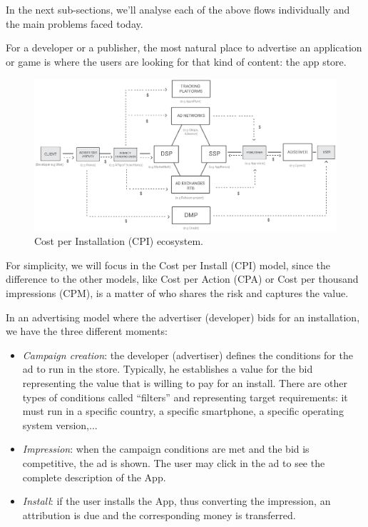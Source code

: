 

In the next sub-sections, we'll analyse each of the above flows individually and the main problems faced today.


For a developer or a publisher, the most natural place to advertise an application or game is where the users are looking for that kind of content: the app store.

\begin{figure}[!ht]
\centering
\includegraphics[width=\textwidth]{diagrams/cpi_flow.eps}
\caption{Cost per Installation (CPI) ecosystem.}
\label{fig:exist_flows}
\end{figure}

For simplicity, we will focus in the Cost per Install (CPI) model, since the difference to the other models, like Cost per Action (CPA) or Cost per thousand impressions (CPM), is a matter of who shares the risk and captures the value.

In an advertising model where the advertiser (developer) bids for an installation, we have the three different moments:


\begin{itemize}
\item {\em Campaign creation}: the developer (advertiser) defines the conditions for the ad to run in the store. Typically, he establishes a value for the bid representing the value that is willing to pay for an install. There are other types of conditions called ``filters'' and representing target requirements: it must run in a specific country, a specific smartphone, a specific operating system version,...
\item {\em Impression}: when the campaign conditions are met and the bid is competitive, the ad is shown. The user may click in the ad to see the complete description of the App.
\item {\em Install}: if the user installs the App, thus converting the impression, an attribution is due and the corresponding money is transferred.
\end{itemize}

